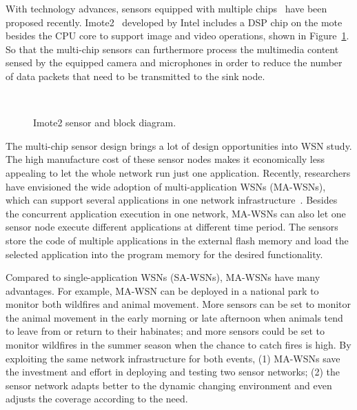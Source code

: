 With technology advances, sensors equipped with multiple chips~\cite{imote2} have been proposed recently. Imote2~\cite{imote2} developed by Intel includes a DSP chip on the mote besides the CPU core to support image and video operations, shown in Figure~\ref{fig:imote2}. So that the multi-chip sensors can furthermore process the multimedia content sensed by the equipped camera and microphones in order to reduce the number of data packets that need to be transmitted to the sink node.

\begin{figure}[h]
\centering
\mbox{\quad
      \quad}
\caption{Imote2 sensor and block diagram.}
\label{fig:imote2}
\end{figure}

The multi-chip sensor design brings a lot of design opportunities into WSN study. The high manufacture cost of these sensor nodes makes it economically less appealing to let the whole network run just one application. Recently, researchers have envisioned the wide adoption of multi-application WSNs (MA-WSNs), which can support several applications in one network infrastructure~\cite{melete,ma-wsns}. Besides the concurrent application execution in one network, MA-WSNs can also let one sensor node execute different applications at different time period.
The sensors store the code of multiple applications in the external flash memory and load the selected application into the program memory for the desired functionality.

Compared to single-application WSNs (SA-WSNs), MA-WSNs have many advantages. For example, MA-WSN can be deployed in a national park to monitor both wildfires and animal movement. More sensors can be set to monitor the animal movement in the early morning or late afternoon when animals tend to leave from or return to their habinates; and more sensors could be set to monitor wildfires in the summer season when the chance to catch fires is high. By exploiting the same network infrastructure for both events, (1) MA-WSNs save the investment and effort in deploying and testing two sensor networks; (2) the sensor network adapts better to the dynamic changing environment and even adjusts the coverage according to the need.

